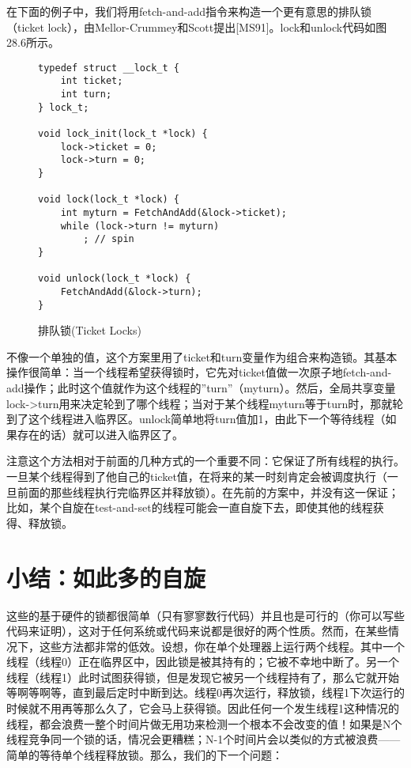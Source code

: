 在下面的例子中，我们将用fetch-and-add指令来构造一个更有意思的排队锁（ticket lock），由Mellor-Crummey和Scott提出[MS91]。lock和unlock代码如图28.6所示。

\begin{figure}[ht]
\begin{lstlisting}
typedef struct __lock_t {
    int ticket;
    int turn;
} lock_t;

void lock_init(lock_t *lock) {
    lock->ticket = 0;
    lock->turn = 0;
}

void lock(lock_t *lock) {
    int myturn = FetchAndAdd(&lock->ticket);
    while (lock->turn != myturn)
        ; // spin
}

void unlock(lock_t *lock) {
    FetchAndAdd(&lock->turn);
}
\end{lstlisting}
\caption{排队锁(Ticket Locks)}
\end{figure}


不像一个单独的值，这个方案里用了ticket和turn变量作为组合来构造锁。其基本操作很简单：当一个线程希望获得锁时，它先对ticket值做一次原子地fetch-and-add操作；此时这个值就作为这个线程的”turn”（myturn）。然后，全局共享变量lock->turn用来决定轮到了哪个线程；当对于某个线程myturn等于turn时，那就轮到了这个线程进入临界区。unlock简单地将turn值加1，由此下一个等待线程（如果存在的话）就可以进入临界区了。

注意这个方法相对于前面的几种方式的一个重要不同：它保证了所有线程的执行。一旦某个线程得到了他自己的ticket值，在将来的某一时刻肯定会被调度执行（一旦前面的那些线程执行完临界区并释放锁）。在先前的方案中，并没有这一保证；比如，某个自旋在test-and-set的线程可能会一直自旋下去，即使其他的线程获得、释放锁。


\section{小结：如此多的自旋}

这些的基于硬件的锁都很简单（只有寥寥数行代码）并且也是可行的（你可以写些代码来证明），这对于任何系统或代码来说都是很好的两个性质。然而，在某些情况下，这些方法都非常的低效。设想，你在单个处理器上运行两个线程。其中一个线程（线程0）正在临界区中，因此锁是被其持有的；它被不幸地中断了。另一个线程（线程1）此时试图获得锁，但是发现它被另一个线程持有了，那么它就开始等啊等啊等，直到最后定时中断到达。线程0再次运行，释放锁，线程1下次运行的时候就不用再等那么久了，它会马上获得锁。因此任何一个发生线程1这种情况的线程，都会浪费一整个时间片做无用功来检测一个根本不会改变的值！如果是N个线程竞争同一个锁的话，情况会更糟糕；N-1个时间片会以类似的方式被浪费——简单的等待单个线程释放锁。那么，我们的下一个问题：


